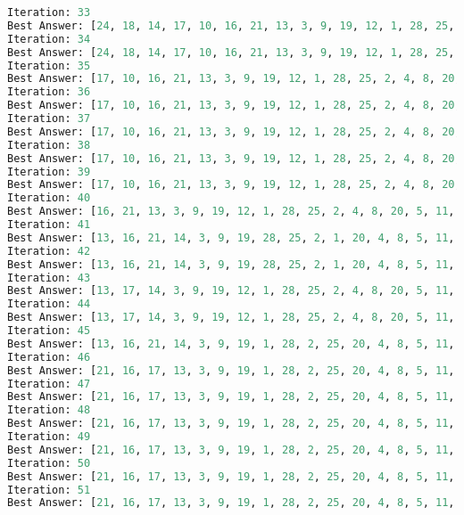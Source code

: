 \documentclass[a4paper, 12pt]{article}
\theoremstyle{definition}
\begin{document}
\begin{lstlisting}[language=Python]
Iteration: 33
Best Answer: [24, 18, 14, 17, 10, 16, 21, 13, 3, 9, 19, 12, 1, 28, 25, 2, 4, 8, 5, 11, 27, 20, 0, 22, 26, 7, 23, 15, 6]: 1971
Iteration: 34
Best Answer: [24, 18, 14, 17, 10, 16, 21, 13, 3, 9, 19, 12, 1, 28, 25, 2, 4, 8, 5, 11, 27, 20, 0, 22, 26, 7, 23, 15, 6]: 1971
Iteration: 35
Best Answer: [17, 10, 16, 21, 13, 3, 9, 19, 12, 1, 28, 25, 2, 4, 8, 20, 5, 11, 27, 0, 23, 7, 22, 26, 15, 6, 24, 18, 14]: 1911
Iteration: 36
Best Answer: [17, 10, 16, 21, 13, 3, 9, 19, 12, 1, 28, 25, 2, 4, 8, 20, 5, 11, 27, 0, 23, 7, 22, 26, 15, 6, 24, 18, 14]: 1911
Iteration: 37
Best Answer: [17, 10, 16, 21, 13, 3, 9, 19, 12, 1, 28, 25, 2, 4, 8, 20, 5, 11, 27, 0, 23, 7, 22, 26, 15, 6, 24, 18, 14]: 1911
Iteration: 38
Best Answer: [17, 10, 16, 21, 13, 3, 9, 19, 12, 1, 28, 25, 2, 4, 8, 20, 5, 11, 27, 0, 23, 7, 22, 26, 15, 6, 24, 18, 14]: 1911
Iteration: 39
Best Answer: [17, 10, 16, 21, 13, 3, 9, 19, 12, 1, 28, 25, 2, 4, 8, 20, 5, 11, 27, 0, 23, 7, 22, 26, 15, 6, 24, 18, 14]: 1911
Iteration: 40
Best Answer: [16, 21, 13, 3, 9, 19, 12, 1, 28, 25, 2, 4, 8, 20, 5, 11, 27, 0, 23, 7, 26, 15, 22, 6, 24, 18, 14, 17, 10]: 1873
Iteration: 41
Best Answer: [13, 16, 21, 14, 3, 9, 19, 28, 25, 2, 1, 20, 4, 8, 5, 11, 27, 0, 23, 7, 26, 22, 6, 24, 18, 15, 12, 17, 10]: 1833
Iteration: 42
Best Answer: [13, 16, 21, 14, 3, 9, 19, 28, 25, 2, 1, 20, 4, 8, 5, 11, 27, 0, 23, 7, 26, 22, 6, 24, 18, 15, 12, 17, 10]: 1833
Iteration: 43
Best Answer: [13, 17, 14, 3, 9, 19, 12, 1, 28, 25, 2, 4, 8, 20, 5, 11, 27, 0, 23, 7, 26, 15, 22, 6, 24, 18, 10, 16, 21]: 1797
Iteration: 44
Best Answer: [13, 17, 14, 3, 9, 19, 12, 1, 28, 25, 2, 4, 8, 20, 5, 11, 27, 0, 23, 7, 26, 15, 22, 6, 24, 18, 10, 16, 21]: 1797
Iteration: 45
Best Answer: [13, 16, 21, 14, 3, 9, 19, 1, 28, 2, 25, 20, 4, 8, 5, 11, 27, 0, 23, 7, 26, 22, 6, 24, 18, 15, 12, 17, 10]: 1786
Iteration: 46
Best Answer: [21, 16, 17, 13, 3, 9, 19, 1, 28, 2, 25, 20, 4, 8, 5, 11, 27, 0, 23, 7, 26, 22, 6, 24, 18, 15, 12, 14, 10]: 1726
Iteration: 47
Best Answer: [21, 16, 17, 13, 3, 9, 19, 1, 28, 2, 25, 20, 4, 8, 5, 11, 27, 0, 23, 7, 26, 22, 6, 24, 18, 15, 12, 14, 10]: 1726
Iteration: 48
Best Answer: [21, 16, 17, 13, 3, 9, 19, 1, 28, 2, 25, 20, 4, 8, 5, 11, 27, 0, 23, 7, 26, 22, 6, 24, 18, 15, 12, 14, 10]: 1726
Iteration: 49
Best Answer: [21, 16, 17, 13, 3, 9, 19, 1, 28, 2, 25, 20, 4, 8, 5, 11, 27, 0, 23, 7, 26, 22, 6, 24, 18, 15, 12, 14, 10]: 1726
Iteration: 50
Best Answer: [21, 16, 17, 13, 3, 9, 19, 1, 28, 2, 25, 20, 4, 8, 5, 11, 27, 0, 23, 7, 26, 22, 6, 24, 18, 15, 12, 14, 10]: 1726
Iteration: 51
Best Answer: [21, 16, 17, 13, 3, 9, 19, 1, 28, 2, 25, 20, 4, 8, 5, 11, 27, 0, 23, 7, 26, 22, 6, 24, 18, 15, 12, 14, 10]: 1726

\end{lstlisting}
\end{document}
